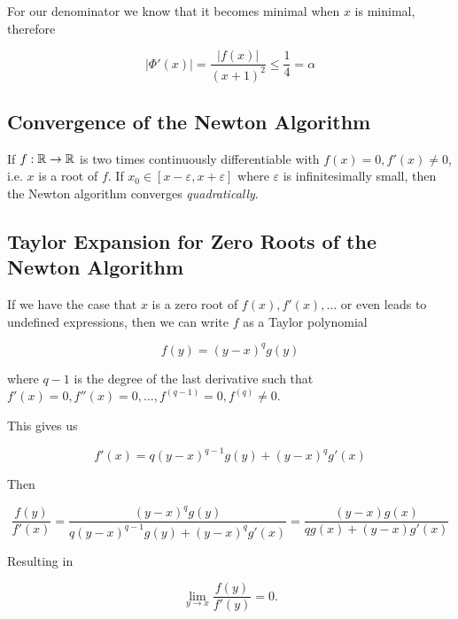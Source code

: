 For our denominator we know that it becomes minimal when \(x\) is minimal, therefore

\[
    |\Phi'(x)| = \frac{|f(x)|}{(x + 1)^2} \le \frac{1}{4} = \alpha
\]

\subsection{Convergence of the Newton Algorithm}

If \(f: \mathbb{R} \to \mathbb{R}\) is two times continuously differentiable with \(f(x)= 0, f'(x) \ne 0\), i.e. \(x\) is a root of \(f\). 
If \(x_0 \in [x - \varepsilon, x + \varepsilon]\) where \(\varepsilon\) is infinitesimally small, then the Newton algorithm converges 
\emph{quadratically}.


\subsection{Taylor Expansion for Zero Roots of the Newton Algorithm}

If we have the case that \(x\) is a zero root of \(f(x), f'(x), \dots\) or even leads to undefined expressions, then we can write \(f\) as 
a Taylor polynomial 

\[
    f(y) = (y - x)^q g(y)
\]

where \(q - 1\) is the degree of the last derivative such that \(f'(x) = 0, f''(x) = 0, \dots, f^{(q - 1)} = 0, f^{(q)}\ne 0\).

This gives us 

\[
    f'(x) = q(y - x)^{q - 1} g(y) + (y - x)^q g'(x)
\]

Then 

\[
    \frac{f(y)}{f'(x)} = \frac{(y - x)^q g(y)}{q(y - x)^{q - 1} g(y) + (y - x)^q g'(x)} = \frac{(y - x)g(x)}{qg(x) + (y - x)g'(x)}
\]

Resulting in 

\[
    \lim_{y \to x} \frac{f(y)}{f'(y)} = 0.
\]

